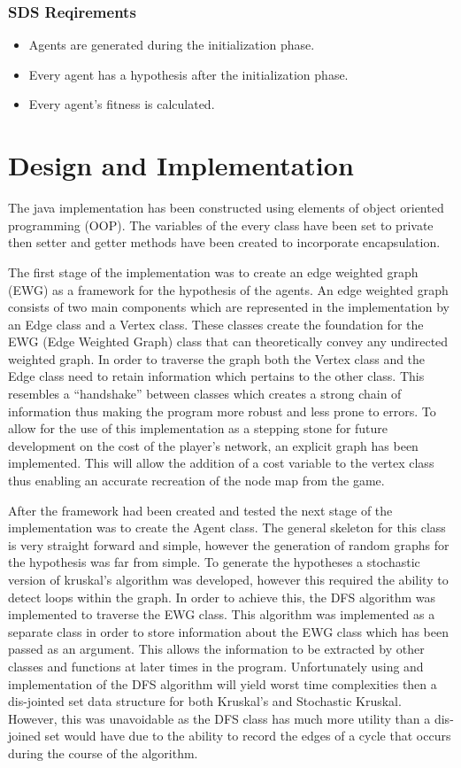 \documentclass{AISB2008}
\begin{document}
\subsubsection{SDS Reqirements}

\begin{itemize}
\item Agents are generated during the initialization phase.
\item Every agent has a hypothesis after the initialization phase.
\item Every agent’s fitness is calculated.
\end{itemize}


\section{Design and Implementation}

The java implementation has been constructed using elements of object oriented programming (OOP). The variables of the every class have been set to private then setter and getter methods have been created to incorporate encapsulation.

The first stage of the implementation was to create an edge weighted graph (EWG) as a framework for the hypothesis of the agents. An edge weighted graph consists of two main components which are represented in the implementation by an Edge class and a Vertex class.  These classes create the foundation for the EWG (Edge Weighted Graph) class that can theoretically convey any undirected weighted graph. In order to traverse the graph both the Vertex class and the Edge class need to retain information which pertains to the other class. This resembles a “handshake” between classes which creates a strong chain of information thus making the program more robust and less prone to errors. To allow for the use of this implementation as a stepping stone for future development on the cost of the player’s network, an explicit graph has been implemented. This will allow the addition of a cost variable to the vertex class thus enabling an accurate recreation of the node map from the game.

After the framework had been created and tested the next stage of the implementation was to create the Agent class. The general skeleton for this class is very straight forward and simple, however the generation of random graphs for the hypothesis was far from simple. To generate the hypotheses a stochastic version of kruskal’s algorithm was developed, however this required the ability to detect loops within the graph. In order to achieve this, the DFS algorithm was implemented to traverse the EWG class. This algorithm was implemented as a separate class in order to store information about the EWG class which has been passed as an argument. This allows the information to be extracted by other classes and functions at later times in the program. Unfortunately using and implementation of the DFS algorithm will yield worst time complexities then a dis-jointed set data structure for both Kruskal’s and Stochastic Kruskal. However, this was unavoidable as the DFS class has much more utility than a dis-joined set would have due to the ability to record the edges of a cycle that occurs during the course of the algorithm.
\end{document}
